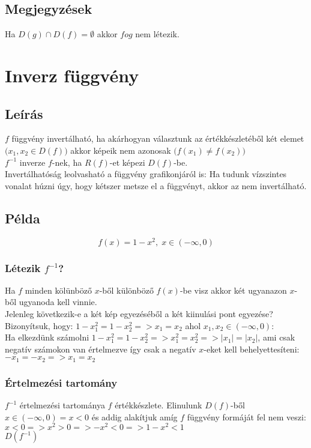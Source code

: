 \documentclass{article}
\theoremstyle{mytheoremstyle}
\theoremstyle{mytheoremstyle}
\theoremstyle{myproblemstyle}
\begin{document}
\subsection{Megjegyzések}
Ha $D(g) \cap D(f) = \emptyset$ akkor $fog$ nem létezik.
\section{Inverz függvény}
\subsection{Leírás}
$f$ függvény invertálható, ha akárhogyan választunk az értékkészletéből
két elemet $\bigl(x_1,x_2\in D(f)\bigr)$ akkor képeik nem azonosak
$\bigl(f(x_1)\neq f(x_2)\bigr)$\\
$f^{-1}$ inverze $f$-nek, ha $R(f)$-et képezi $D(f)$-be.\\
Invertálhatóság leolvasható a függvény grafikonjáról is:
Ha tudunk vízszintes vonalat húzni úgy, hogy kétszer metsze el a függvényt,
akkor az nem invertálható.\\
\subsection{Példa}
$$f(x)=1-x^2,\;x\in (-\infty ,0)$$
\subsubsection{Létezik $f^{-1}$?}
Ha $f$ minden kölünböző $x$-ből különböző $f(x)$-be visz akkor két ugyanazon
$x$-ből ugyanoda kell vinnie.\\
Jelenleg következik-e a két kép egyezéséből a két kiinulási pont egyezése?\\
Bizonyítsuk, hogy: $1-x_1^2=1-x_2^2=>x_1=x_2$ ahol $x_1,x_2\in (-\infty,0)$:\\
Ha elkezdünk számolni $1-x_1^2=1-x_2^2=>x_1^2=x_2^2=>|x_1|=|x_2|$, ami csak negatív számokon
van értelmezve így csak a negatív $x$-eket kell behelyettesíteni:
$-x_1=-x_2=>x_1=x_2$\\
\subsubsection{Értelmezési tartomány}
$f^{-1}$ értelmezési tartománya $f$ értékkészlete. Elinulunk $D(f)$-ből 
$x\in (-\infty ,0)=x<0$
és addig alakítjuk amíg $f$ függvény formáját fel nem veszi:\\
$x<0=>x^2>0=>-x^2<0=>1-x^2<1$\\
$D(f^{-1})$
\end{document}
